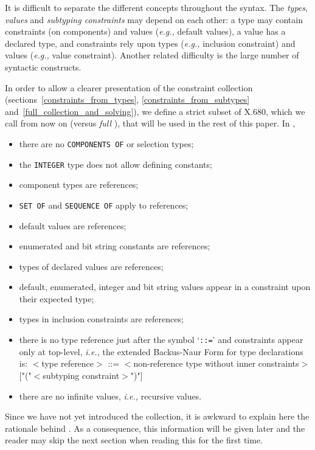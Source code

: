 
It is difficult to separate the different concepts throughout the
syntax. The \emph{types}, \emph{values} and \emph{subtyping
  constraints} may depend on each other: a type may contain
constraints (on components) and values (\emph{e.g.,} default values),
a value has a declared type, and constraints rely upon types
(\emph{e.g.,} inclusion constraint) and values (\emph{e.g.,} value
constraint). Another related difficulty is the large number of
syntactic constructs.

In order to allow a clearer presentation of the constraint collection
(sections~\ref{constraints_from_types},
\ref{constraints_from_subtypes}
and~\ref{full_collection_and_solving}), we define a strict subset of
\mbox{X.680}, which we call from now on \core (versus \emph{full}
\ASN), that will be used in the rest of this paper. In \core,
  \begin{itemize}

    \item there are no \texttt{\small COMPONENTS OF} or selection
      types;

    \item the \texttt{\small INTEGER} type does not allow defining
          constants;

    \item component types are references;

    \item \texttt{\small SET OF} and \texttt{\small SEQUENCE OF} apply
          to references;

    \item default values are references;

    \item enumerated and bit string constants are references;

    \item types of declared values are references;

    \item default, enumerated, integer and bit string values appear in
          a constraint upon their expected type;
 
    \item types in inclusion constraints are references;

    \item there is no type reference just after the symbol
      `\texttt{\small ::=}' and constraints appear only at top-level,
      \emph{i.e.,} the extended Backus-Naur Form for type declarations
      is: {\small $<$\textsf{type reference}$>$ \textsf{::=}
        $<$\textsf{non-reference type without inner constraints}$>$
        \textsf{[}"("$<$\textsf{subtyping constraint}$>$")"\textsf{]}
      }
    \item there are no infinite values, \emph{i.e.,} recursive values.

  \end{itemize}
Since we have not yet introduced the collection, it is awkward to
explain here the rationale behind \core. As a consequence, this
information will be given later and the reader may skip the
next section when reading this for the first time.


